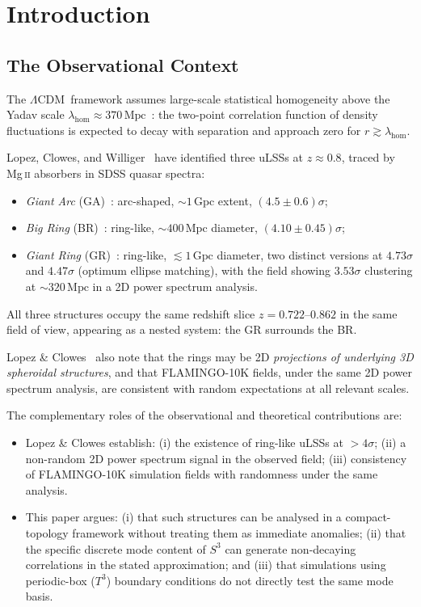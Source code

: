 \documentclass[
  aps,
  prd,
  reprint,
  superscriptaddress,
  nofootinbib,
  longbibliography,
  floatfix,
  amsmath,
  amssymb
]{revtex4-2}
\theoremstyle{plain}
\theoremstyle{definition}
\theoremstyle{remark}
\newcommand{\LCDM}{\ensuremath{\Lambda}CDM}
\newcommand{\Sthree}{S^3}
\begin{document}
\section{Introduction}
\label{sec:intro}

\subsection{The Observational Context}

The \LCDM\ framework assumes large-scale statistical homogeneity above
the Yadav scale $\lambda_{\mathrm{hom}}\approx 370\,\mathrm{Mpc}$~\cite{Yadav2010}:
the two-point correlation function of density fluctuations is expected
to decay with separation and approach zero for $r\gtrsim\lambda_{\mathrm{hom}}$.

Lopez, Clowes, and Williger~\cite{Lopez2022,Lopez2024,Lopez2026} have
identified three uLSSs at $z\approx 0.8$, traced by Mg\,\textsc{ii}
absorbers in SDSS quasar spectra:
\begin{itemize}[noitemsep]
\item \emph{Giant Arc} (GA)~\cite{Lopez2022}: arc-shaped,
  $\sim 1\,\mathrm{Gpc}$ extent, $(4.5\pm0.6)\sigma$;
\item \emph{Big Ring} (BR)~\cite{Lopez2024}: ring-like,
  $\sim 400\,\mathrm{Mpc}$ diameter, $(4.10\pm0.45)\sigma$;
\item \emph{Giant Ring} (GR)~\cite{Lopez2026}: ring-like,
  $\lesssim 1\,\mathrm{Gpc}$ diameter, two distinct versions at
  $4.73\sigma$ and $4.47\sigma$ (optimum ellipse matching), with
  the field showing $3.53\sigma$ clustering at $\sim 320\,\mathrm{Mpc}$
  in a 2D power spectrum analysis.
\end{itemize}
All three structures occupy the same redshift slice
$z=0.722$--$0.862$ in the same field of view, appearing as a nested
system: the GR surrounds the BR.

Lopez \& Clowes~\cite{Lopez2026} also note that the rings may be 2D
\emph{projections of underlying 3D spheroidal structures}, and that
FLAMINGO-10K fields, under the same 2D power spectrum analysis, are
consistent with random expectations at all relevant scales.

\medskip
The complementary roles of the observational and theoretical
contributions are:
\begin{itemize}[noitemsep]
\item Lopez \& Clowes establish: (i) the existence of ring-like uLSSs
  at $>4\sigma$; (ii) a non-random 2D power spectrum signal in the
  observed field; (iii) consistency of FLAMINGO-10K simulation fields
  with randomness under the same analysis.
\item This paper argues: (i) that such structures can be analysed in a
  compact-topology framework without treating them as immediate
  anomalies; (ii) that the specific discrete mode content of $\Sthree$
  can generate non-decaying correlations in the stated approximation;
  and (iii) that simulations using periodic-box ($T^3$) boundary
  conditions do not directly test the same mode basis.
\end{itemize}
\end{document}
